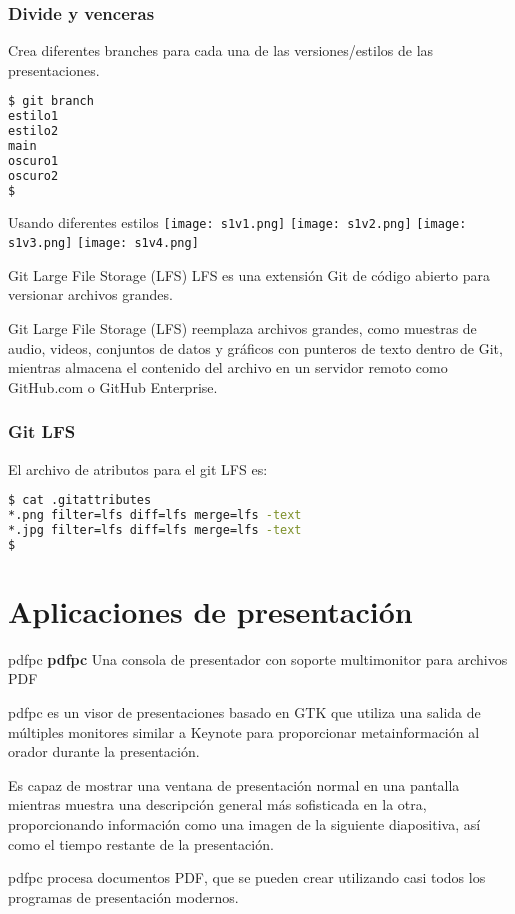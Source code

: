 \begin{frame}[fragile]
  \frametitle{Divide y venceras}
  Crea diferentes branches para cada una de las versiones/estilos de las
  presentaciones.
  \begin{lstlisting}[language=Bash,numbers=none]
$ git branch
estilo1
estilo2
main
oscuro1
oscuro2
$
  \end{lstlisting}
\end{frame}

\begin{frame}[c]{Usando diferentes estilos}
  \texttt{[image: s1v1.png]}
  \texttt{[image: s1v2.png]}
  \texttt{[image: s1v3.png]}
  \texttt{[image: s1v4.png]}
\end{frame}

\begin{frame}[c]{Git Large File Storage (LFS)}
  LFS es una extensión Git de código abierto para versionar archivos
  grandes.

  \vspace{\baselineskip}
  Git Large File Storage (LFS) reemplaza archivos grandes, como muestras
  de audio, videos, conjuntos de datos y gráficos con punteros de texto
  dentro de Git, mientras almacena el contenido del archivo en un servidor
  remoto como GitHub.com o GitHub Enterprise.
\end{frame}

\begin{frame}[fragile]
  \frametitle{Git LFS}
  El archivo de atributos para el git LFS es:
  \begin{lstlisting}[language=Bash,numbers=none]
$ cat .gitattributes
*.png filter=lfs diff=lfs merge=lfs -text
*.jpg filter=lfs diff=lfs merge=lfs -text
$
  \end{lstlisting}
\end{frame}

\section{Aplicaciones de presentación }

\begin{frame}[c]{pdfpc}
  \textbf{pdfpc} Una consola de presentador con soporte multimonitor
  para archivos PDF

  \vspace{\baselineskip}
  pdfpc es un visor de presentaciones basado en GTK que utiliza una salida
  de múltiples monitores similar a Keynote para proporcionar metainformación
  al orador durante la presentación.

  \vspace{\baselineskip}
  Es capaz de mostrar una ventana de presentación normal en una pantalla
  mientras muestra una descripción general más sofisticada en la otra,
  proporcionando información como una imagen de la siguiente diapositiva,
  así como el tiempo restante de la presentación.

  \vspace{\baselineskip}
  pdfpc procesa documentos PDF, que se pueden crear utilizando casi todos
  los programas de presentación modernos.
\end{frame}

